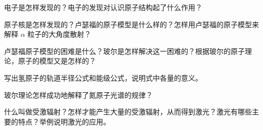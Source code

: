 \begin{Review}
\begin{question}
  \item 电子是怎样发现的？电子的发现对认识原子结构起了什么作用？
  \item 原子核是怎样发现的？卢瑟福的原子模型是什么样的？怎样用卢瑟福的原子模型来解释 $\alpha$ 粒子的大角度散射？
  \item 卢瑟福原子模型的困难是什么？玻尔是怎样解决这一困难的？根据玻尔的原子理论，原子的模型又是怎样的？
  \item 写出氢原子的轨道半径公式和能级公式，说明式中各量的意义。
  \item 玻尔理论怎样成功地解释了氮原子光谱的规律？
  \item 什么叫做受激辐射？怎样才能产生大量的受激辐射，从而得到激光？激光有哪些主要的特点？举例说明激光的应用。
\end{question}
\end{Review}